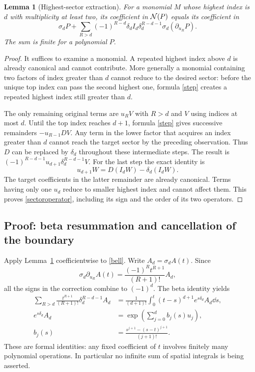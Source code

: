 \documentclass[11pt]{article}
\numberwithin{equation}{section}
\newtheorem{lemma}[theorem]{Lemma}
\theoremstyle{definition}\newtheorem{definition}[theorem]{Definition}
\theoremstyle{remark}\newtheorem{remark}[theorem]{Remark}
\begin{document}
\begin{lemma}[Highest-sector extraction]\label{sectorlemma}
For a monomial $M$ whose highest index is $d$ with multiplicity at least two, its coefficient in $\mathcal N(P)$ equals its coefficient in
\begin{equation}\label{sectoroperator}
 \sigma_dP+
 \sum_{R>d}(-1)^{R-d}\delta_d I_d\delta_d^{R-d-1}
                 \sigma_d(\partial_{u_R}P).
\end{equation}
The sum is finite for a polynomial $P$.
\end{lemma}
\begin{proof}
It suffices to examine a monomial. A repeated highest index above $d$ is already canonical and cannot contribute. More generally a monomial containing two factors of index greater than $d$ cannot reduce to the desired sector: before the unique top index can pass the second highest one, formula \eqref{step} creates a repeated highest index still greater than $d$.

The only remaining original terms are $u_RV$ with $R>d$ and $V$ using indices at most $d$. Until the top index reaches $d+1$, formula \eqref{step} gives successive remainders $-u_{R-1}DV$. Any term in the lower factor that acquires an index greater than $d$ cannot reach the target sector by the preceding observation. Thus $D$ can be replaced by $\delta_d$ throughout these intermediate steps. The result is
$(-1)^{R-d-1}u_{d+1}\delta_d^{R-d-1}V$.
For the last step the exact identity is
\[
 u_{d+1}W=D(I_dW)-\delta_d(I_dW).
\]
The target coefficients in the latter remainder are already canonical. Terms having only one $u_d$ reduce to smaller highest index and cannot affect them. This proves \eqref{sectoroperator}, including its sign and the order of its two operators.
\end{proof}

\subsection{Proof: beta resummation and cancellation of the boundary}
Apply Lemma~\ref{sectorlemma} coefficientwise to \eqref{bell}. Write $A_d=\sigma_d A(t)$. Since
\[
 \sigma_d\partial_{u_R}A(t)=\frac{(-1)^Rt^{R+1}}{(R+1)!}A_d,
\]
all the signs in the correction combine to $(-1)^d$. The beta identity yields
\begin{equation}\label{resumproof}
\begin{split}
 \sum_{R>d}\frac{t^{R+1}}{(R+1)!}\delta_d^{R-d-1}A_d
 &=\frac1{(d+1)!}\int_0^t(t-s)^{d+1}e^{s\delta_d}A_d\dd s,\\
 e^{s\delta_d}A_d&=\exp\left(\sum_{j=0}^d b_j(s)u_j\right),\\
 b_j(s)&=\frac{s^{j+1}-(s-t)^{j+1}}{(j+1)!}.
\end{split}
\end{equation}
These are formal identities: any fixed coefficient of $t$ involves finitely many polynomial operations. In particular no infinite sum of spatial integrals is being asserted.
\end{document}
